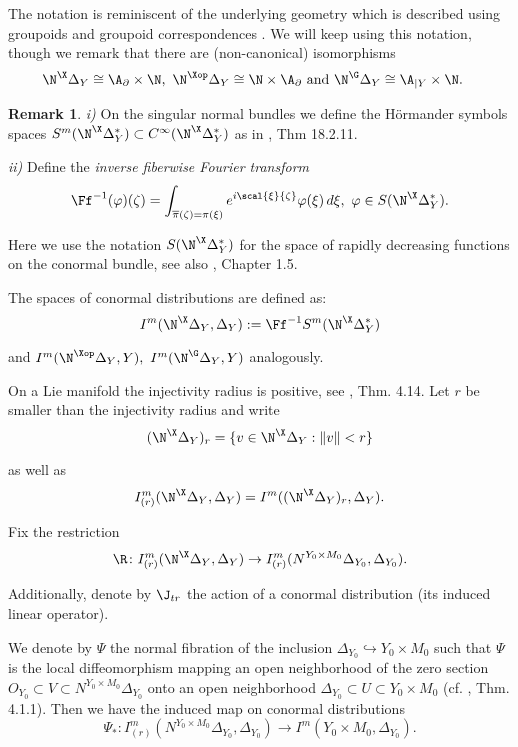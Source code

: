 \documentclass[10pt, reqno]{amsart}
\theoremstyle{definition}
\newtheorem{Rem}[Thm]{Remark}
\begin{document}
The notation is reminiscent of the underlying geometry which is described using groupoids and groupoid correspondences \cite{B2}.
We will keep using this notation, though we remark that there are (non-canonical) isomorphisms
\begin{align*}
& \N^{\X} \Delta_Y \cong \A_{\partial} \times \N, \ \N^{\Xop} \Delta_{Y} \cong \N \times \A_{\partial} \ \text{and} \ \N^{\G} \Delta_Y \cong \A_{|Y} \times \N. 
\end{align*}

\begin{Rem}
\emph{i)} On the singular normal bundles we define the H\"ormander symbols spaces $S^m(\N^{\X} \Delta_Y^{\ast}) \subset C^{\infty}(\N^{\X} \Delta_Y^{\ast})$ as in \cite{HIII}, Thm 18.2.11.

\emph{ii)} Define the \emph{inverse fiberwise Fourier transform} 
\[
\Ff^{-1}(\varphi)(\zeta) = \int_{\overline{\pi}(\zeta) = \pi(\xi)} e^{i \scal{\xi}{\zeta}} \varphi(\xi) \,d\xi, \ \varphi \in S(\N^{\X} \Delta_Y^{\ast}).
\]

Here we use the notation $S(\N^{\X} \Delta_Y^{\ast})$ for the space of rapidly decreasing functions on the conormal bundle, see also \cite{S}, Chapter 1.5. 

The spaces of conormal distributions are defined as:
\[
I^{m}(\N^{\X} \Delta_Y, \Delta_Y) := \Ff^{-1} S^m(\N^{\X} \Delta_Y^{\ast})
\]

and $I^{m}(\N^{\Xop} \Delta_Y, Y), \ I^{m}(\N^{\G} \Delta_Y, Y)$ analogously.

\label{Rem:fwise}
\end{Rem}

On a Lie manifold the injectivity radius is positive, see \cite{ALN2}, Thm. 4.14. 
Let $r$ be smaller than the injectivity radius and write 
\[
(\N^{\X} \Delta_Y)_r = \{v \in \N^{\X} \Delta_Y : \|v\| < r\}
\]

as well as
\[
I_{(r)}^m(\N^{\X} \Delta_Y, \Delta_Y) = I^m((\N^{\X} \Delta_Y)_r, \Delta_Y).
\]

Fix the restriction 
\[
\R \colon I_{(r)}^m(\N^{\X} \Delta_Y, \Delta_Y) \to I_{(r)}^m(N^{Y_0 \times M_0} \Delta_{Y_0}, \Delta_{Y_0}).
\]

Additionally, denote by $\J_{tr}$ the action of a conormal distribution (its induced linear operator).

We denote by $\Psi$ the normal fibration of the inclusion $\Delta_{Y_0} \hookrightarrow Y_0 \times M_0$
such that $\Psi$ is the local diffeomorphism mapping an open neighborhood of the zero section $O_{Y_0} \subset V \subset N^{Y_0 \times M_0} \Delta_{Y_0}$
onto an open neighborhood $\Delta_{Y_0} \subset U \subset Y_0 \times M_0$ (cf. \cite{S}, Thm. 4.1.1). 
Then we have the induced map on conormal distributions
\[
\Psi_{\ast} \colon I_{(r)}^m(N^{Y_0 \times M_0} \Delta_{Y_0}, \Delta_{Y_0}) \to I^m(Y_0 \times M_0, \Delta_{Y_0}).
\]
\end{document}
